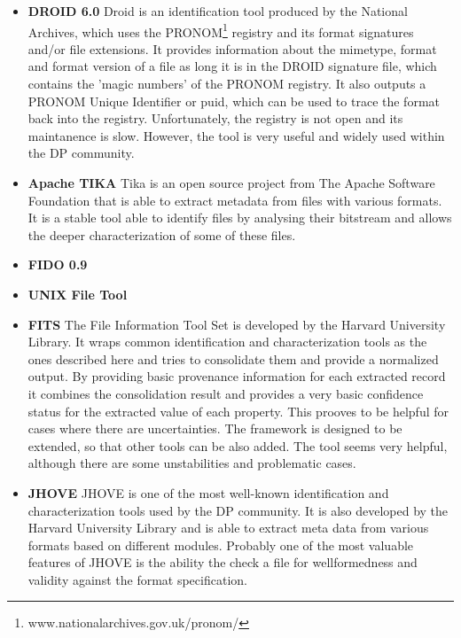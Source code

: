 \begin{itemize}
\item \textbf{DROID 6.0}\newline
Droid is an identification tool produced by the National Archives, which uses the PRONOM\footnote{www.nationalarchives.gov.uk/pronom/} registry and its format signatures and/or file extensions. It provides information about the mimetype, format and format version of a file as long it is in the DROID signature file, which contains the 'magic numbers' of the PRONOM registry. It also outputs a PRONOM Unique Identifier or puid, which can be used to trace the format back into the registry.
Unfortunately, the registry is not open and its maintanence is slow. However, the tool is very useful and widely used within the DP community.

\item \textbf{Apache TIKA}\newline
Tika is an open source project from The Apache Software Foundation that is able to extract metadata from files with various formats. It is a stable tool able to identify files by analysing their bitstream and allows the deeper characterization of some of these files.  

\item \textbf{FIDO 0.9}\newline

\item \textbf{UNIX File Tool}\newline

\item \textbf{FITS} \newline
The File Information Tool Set is developed by the Harvard University Library. It wraps common identification and characterization tools as the ones described here and tries to consolidate them and provide a normalized output. By providing basic provenance information for each extracted record it combines the consolidation result and provides a very basic confidence status for the extracted value of each property. This prooves to be helpful for cases where there are uncertainties. The framework is designed to be extended, so that other tools can be also added. The tool seems very helpful, although there are some unstabilities and problematic cases.

\item \textbf{JHOVE}\newline
JHOVE is one of the most well-known identification and characterization tools used by the DP community. It is also developed by the Harvard University Library and is able to extract meta data from various formats based on different modules. Probably one of the most valuable features of JHOVE is the ability the check a file for wellformedness and validity against the format specification.


\end{itemize}
